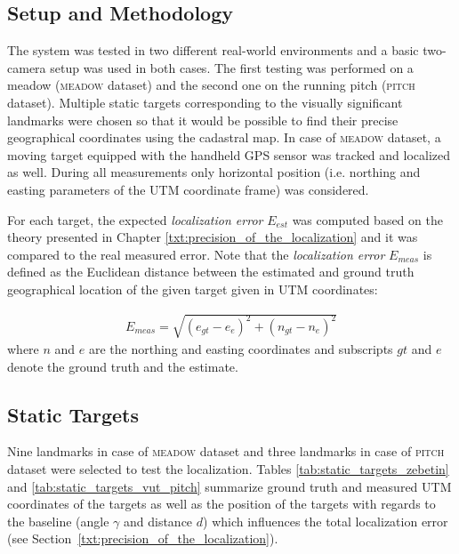 \subsection{Setup and Methodology} \label{txt:setup_and_methodology}

The system was tested in two different real-world environments and a basic two-camera setup was used in both cases. The first testing was performed on a meadow (\textsc{meadow} dataset) and the second one on the running pitch (\textsc{pitch} dataset). Multiple static targets corresponding to the visually significant landmarks were chosen so that it would be possible to find their precise geographical coordinates using the cadastral map. In case of \textsc{meadow} dataset, a moving target equipped with the handheld GPS sensor was tracked and localized as well. During all measurements only horizontal position (i.e. northing and easting parameters of the UTM coordinate frame) was considered.

For each target, the expected \textit{localization error} $E_{est}$ was computed based on the theory presented in Chapter \ref{txt:precision_of_the_localization} and it was compared to the real measured error. Note that the \textit{localization error} $E_{meas}$ is defined as the Euclidean distance between the estimated and ground truth geographical location of the given target given in UTM coordinates:

\begin{align}
	E_{meas} = \sqrt{(e_{gt} - e_{e})^{2} + (n_{gt} - n_{e})^{2}}
\end{align}
where $n$ and $e$ are the northing and easting coordinates and subscripts $gt$ and $e$ denote the ground truth and the estimate.

\subsection{Static Targets}

Nine landmarks in case of \textsc{meadow} dataset and three landmarks in case of \textsc{pitch} dataset were selected to test the localization. Tables \ref{tab:static_targets_zebetin} and \ref{tab:static_targets_vut_pitch} summarize ground truth and measured UTM coordinates of the targets as well as the position of the targets with regards to the baseline (angle $\gamma$ and distance $d$) which influences the total localization error (see Section~\ref{txt:precision_of_the_localization}). 

